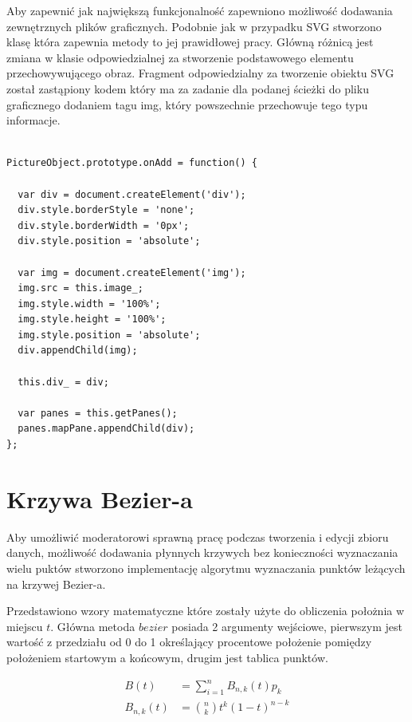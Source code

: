 Aby zapewnić jak największą funkcjonalność zapewniono możliwość dodawania zewnętrznych plików graficznych.
Podobnie jak w przypadku SVG stworzono klasę która zapewnia metody to jej prawidłowej pracy. Główną różnicą jest zmiana w klasie odpowiedzialnej za stworzenie podstawowego elementu przechowywującego obraz. Fragment odpowiedzialny za tworzenie obiektu SVG został zastąpiony kodem który ma za zadanie dla podanej ścieżki do pliku graficznego dodaniem tagu img, który powszechnie przechowuje tego typu informacje.

\lstset{language=JavaScript}
\begin{lstlisting}[label={lst:svgImpl},caption={Klasa do obsługi SVG}]

PictureObject.prototype.onAdd = function() {

  var div = document.createElement('div');
  div.style.borderStyle = 'none';
  div.style.borderWidth = '0px';
  div.style.position = 'absolute';

  var img = document.createElement('img');
  img.src = this.image_;
  img.style.width = '100%';
  img.style.height = '100%';
  img.style.position = 'absolute';
  div.appendChild(img);

  this.div_ = div;

  var panes = this.getPanes();
  panes.mapPane.appendChild(div);
};

\end{lstlisting}


\section{Krzywa Bezier-a}
\label{sec:bezierimpl}

Aby umożliwić moderatorowi sprawną pracę podczas tworzenia i edycji zbioru danych, możliwość dodawania płynnych krzywych bez konieczności wyznaczania wielu puktów stworzono implementację algorytmu wyznaczania punktów leżących na krzywej Bezier-a.

Przedstawiono wzory matematyczne które zostały użyte do obliczenia położnia w miejscu $t$. Główna metoda $bezier$ posiada 2 argumenty wejściowe, pierwszym jest wartość z przedziału od 0 do 1 określający procentowe położenie pomiędzy położeniem  startowym a końcowym, drugim jest tablica punktów.

\begin{eqnarray}
B(t) &= \sum\limits_{i=1}^n B_{n,k} (t) p_{k} \\
B_{n,k}(t) &=\binom{n}{k} t^k(1-t)^{n-k}
\end{eqnarray}


